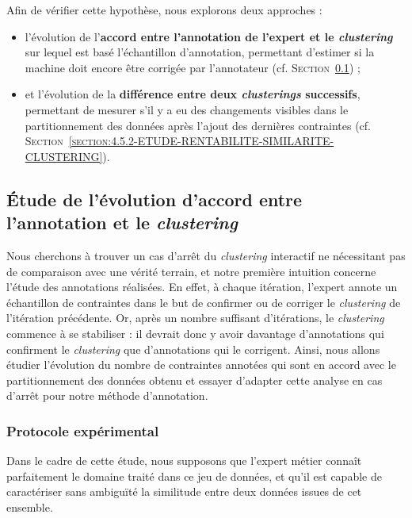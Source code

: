 	Afin de vérifier cette hypothèse, nous explorons deux approches :
	\begin{itemize}
		\item l'évolution de l'\textbf{accord entre l'annotation de l'expert et le \textit{clustering}} sur lequel est basé l'échantillon d'annotation, permettant d'estimer si la machine doit encore être corrigée par l'annotateur  (cf. \textsc{Section~\ref{section:4.5.1-ETUDE-RENTABILITE-ACCORD-ANNOTATION-CLUSTERING}}) ;
		\item et l'évolution de la \textbf{différence entre deux \textit{clusterings} successifs}, permettant de mesurer s'il y a eu des changements visibles dans le partitionnement des données après l'ajout des dernières contraintes (cf. \textsc{Section~\ref{section:4.5.2-ETUDE-RENTABILITE-SIMILARITE-CLUSTERING}}).
	\end{itemize}
	
	
	\subsection{Étude de l'évolution d'accord entre l'annotation et le \textit{clustering}}
	\label{section:4.5.1-ETUDE-RENTABILITE-ACCORD-ANNOTATION-CLUSTERING}
		
		Nous cherchons à trouver un cas d'arrêt du \textit{clustering} interactif ne nécessitant pas de comparaison avec une vérité terrain, et notre première intuition concerne l'étude des annotations réalisées.
		En effet, à chaque itération, l'expert annote un échantillon de contraintes dans le but de confirmer ou de corriger le \textit{clustering} de l'itération précédente.
		Or, après un nombre suffisant d'itérations, le \textit{clustering} commence à se stabiliser : il devrait donc y avoir davantage d’annotations qui confirment le \textit{clustering} que d'annotations qui le corrigent.
		Ainsi, nous allons étudier l'évolution du nombre de contraintes annotées qui sont en accord avec le partitionnement des données obtenu et essayer d'adapter cette analyse en cas d'arrêt pour notre méthode d'annotation.
	
		\subsubsection{Protocole expérimental}
			
			\begin{leftBarWarning}
				Dans le cadre de cette étude, nous supposons que l'expert métier connaît parfaitement le domaine traité dans ce jeu de données, et qu'il est capable de caractériser sans ambiguïté la similitude entre deux données issues de cet ensemble.
			\end{leftBarWarning}
			
